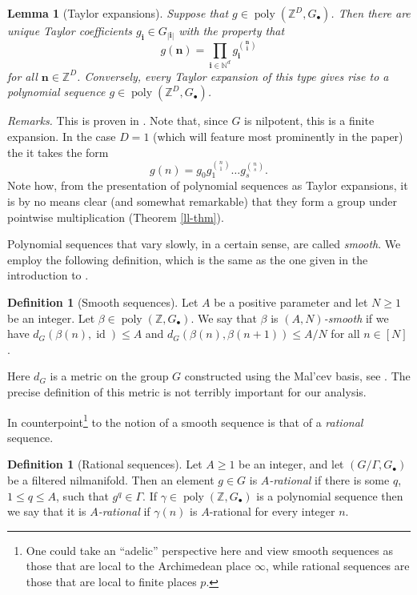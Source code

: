 \documentclass[11pt,reqno]{amsart}
\numberwithin{equation}{section}
\theoremstyle{plain}
\newtheorem{lemma}[subsection]{Lemma}
\theoremstyle{definition}
\newtheorem{definition}[subsection]{Definition}
\renewcommand{\leq}{\leqslant}
\renewcommand{\geq}{\geqslant}
\newcommand\Z{\mathbb{Z}}
\newcommand\N{\mathbb{N}}
\newcommand\1{{\bf 1}}
\newcommand\2{{\bf 2}}
\newcommand\poly{\operatorname{poly}}
\newcommand\id{\operatorname{id}}
\begin{document}
\begin{lemma}[Taylor expansions]\label{taylor-lem}
Suppose that $g \in \poly(\Z^D, G_{\bullet})$. Then there are unique \emph{Taylor coefficients} $g_{\mathbf{i}} \in G_{|\mathbf{i}|}$ with the property that 
\[ g(\mathbf{n}) = \prod_{\mathbf{i} \in \N^d} g_{\mathbf{i}}^{\binom{\mathbf{n}}{\mathbf{i}}}\]
for all $\mathbf{n} \in \Z^D$. 
Conversely, every Taylor expansion of this type gives rise to a polynomial sequence $g \in \poly(\Z^D, G_{\bullet})$.
\end{lemma}

\emph{Remarks.} This is proven in \cite[Lemma 6.7]{green-tao-nilratner}. Note that, since $G$ is nilpotent, this is a finite expansion. In the case $D = 1$ (which will feature most prominently in the paper) the it takes the form
\[ g(n) = g_0 g_1^{\binom{n}{1}} \dots g_s^{\binom{n}{s}}.\] Note how, from the presentation of polynomial sequences as Taylor expansions, it is by no means clear (and somewhat remarkable) that they form a group under pointwise multiplication (Theorem \ref{ll-thm}).

Polynomial sequences that vary slowly, in a certain sense, are called \emph{smooth}. We employ the following definition, which is the same as the one given in the introduction to \cite{green-tao-nilratner}. 

\begin{definition}[Smooth sequences]\label{smooth-def}
Let  $A$ be a positive parameter and let $N \geq 1$ be an integer. Let $\beta \in \poly(\Z,G_\bullet)$. We say that $\beta$ is \emph{$(A,N)$-smooth} if we have $d_G(\beta(n),\id) \leq A$ and $d_G(\beta(n),\beta(n+1)) \leq A/N$ for all $n \in [N]$.
\end{definition}

Here $d_G$ is a metric on the group $G$ constructed using the Mal'cev basis, see \cite[Definition 2.2]{green-tao-nilratner}.  The precise definition of this metric is not terribly important for our analysis.  

In counterpoint\footnote{One could take an ``adelic'' perspective here and view smooth sequences as those that are local to the Archimedean place $\infty$, while rational sequences are those that are local to finite places $p$.} to the notion of a smooth sequence is that of a \emph{rational} sequence. 

\begin{definition}[Rational sequences]\label{rational-def}
Let $A \geq 1$ be an integer, and let $(G/\Gamma,G_\bullet)$ be a filtered nilmanifold. Then an element $g \in G$ is \emph{$A$-rational} if there is some $q$, $1 \leq q \leq A$, such that $g^q \in \Gamma$. If $\gamma \in \poly(\Z,G_\bullet)$ is a polynomial sequence then we say that it is \emph{$A$-rational} if $\gamma(n)$ is $A$-rational for every integer $n$.
\end{definition}
\end{document}
